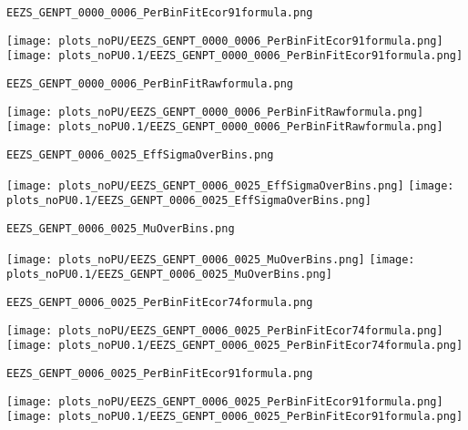 \begin{frame}[fragile]
\begin{verbatim}
EEZS_GENPT_0000_0006_PerBinFitEcor91formula.png
\end{verbatim}
\texttt{[image: plots\_noPU/EEZS\_GENPT\_0000\_0006\_PerBinFitEcor91formula.png]}
\texttt{[image: plots\_noPU0.1/EEZS\_GENPT\_0000\_0006\_PerBinFitEcor91formula.png]}
\end{frame}
\begin{frame}[fragile]
\begin{verbatim}
EEZS_GENPT_0000_0006_PerBinFitRawformula.png
\end{verbatim}
\texttt{[image: plots\_noPU/EEZS\_GENPT\_0000\_0006\_PerBinFitRawformula.png]}
\texttt{[image: plots\_noPU0.1/EEZS\_GENPT\_0000\_0006\_PerBinFitRawformula.png]}
\end{frame}
\begin{frame}[fragile]
\begin{verbatim}
EEZS_GENPT_0006_0025_EffSigmaOverBins.png
\end{verbatim}
\texttt{[image: plots\_noPU/EEZS\_GENPT\_0006\_0025\_EffSigmaOverBins.png]}
\texttt{[image: plots\_noPU0.1/EEZS\_GENPT\_0006\_0025\_EffSigmaOverBins.png]}
\end{frame}
\begin{frame}[fragile]
\begin{verbatim}
EEZS_GENPT_0006_0025_MuOverBins.png
\end{verbatim}
\texttt{[image: plots\_noPU/EEZS\_GENPT\_0006\_0025\_MuOverBins.png]}
\texttt{[image: plots\_noPU0.1/EEZS\_GENPT\_0006\_0025\_MuOverBins.png]}
\end{frame}
\begin{frame}[fragile]
\begin{verbatim}
EEZS_GENPT_0006_0025_PerBinFitEcor74formula.png
\end{verbatim}
\texttt{[image: plots\_noPU/EEZS\_GENPT\_0006\_0025\_PerBinFitEcor74formula.png]}
\texttt{[image: plots\_noPU0.1/EEZS\_GENPT\_0006\_0025\_PerBinFitEcor74formula.png]}
\end{frame}
\begin{frame}[fragile]
\begin{verbatim}
EEZS_GENPT_0006_0025_PerBinFitEcor91formula.png
\end{verbatim}
\texttt{[image: plots\_noPU/EEZS\_GENPT\_0006\_0025\_PerBinFitEcor91formula.png]}
\texttt{[image: plots\_noPU0.1/EEZS\_GENPT\_0006\_0025\_PerBinFitEcor91formula.png]}
\end{frame}
